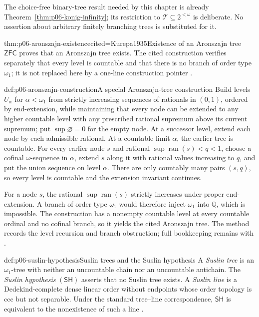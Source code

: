 The choice-free binary-tree result needed by this chapter is already
Theorem~\ref{thm:p06-konig-infinity}; its restriction to
\(\mathcal T\subseteq2^{<\omega}\) is deliberate.  No assertion about arbitrary
finitely branching trees is substituted for it.

\begin{hbtheorem}{thm:p06-aronszajn-existence}{cited=Kurepa1935}{Existence of an Aronszajn tree}
\(\mathsf{ZFC}\) proves that an Aronszajn tree exists.  The cited construction
verifies separately that every level is countable and that there is no branch
of order type \(\omega_1\); it is not replaced here by a one-line construction
pointer \cite{Kurepa1935,Todorcevic1984Trees}.
\end{hbtheorem}

\begin{hbmethod}{def:p06-aronszajn-construction}{A special Aronszajn-tree construction}
Build levels \(U_\alpha\) for \(\alpha<\omega_1\) from strictly increasing
sequences of rationals in \((0,1)\), ordered by end-extension, while
maintaining that every node can be extended to any higher countable level
with any prescribed rational supremum above its current supremum; put
\(\sup\varnothing=0\) for the empty node.  At a
successor level, extend each node by each admissible rational.  At a countable
limit \(\alpha\), the earlier tree is countable.  For every earlier node
\(s\) and rational
\(\sup\operatorname{ran}(s)<q<1\), choose a cofinal
\(\omega\)-sequence in \(\alpha\), extend \(s\) along it with rational values
increasing to \(q\), and put the union sequence on level \(\alpha\).
There are only countably many pairs \((s,q)\), so every level is countable
and the extension invariant continues.

For a node \(s\), the rational \(\sup\operatorname{ran}(s)\) strictly
increases under proper end-extension.  A branch of order type \(\omega_1\)
would therefore inject \(\omega_1\) into \(\mathbb Q\), which is impossible.
The construction has a nonempty countable level at every countable ordinal
and no cofinal branch, so it yields the cited Aronszajn tree.  The method
records the level recursion and branch obstruction; full bookkeeping remains
with \cite{Kurepa1935,Todorcevic1984Trees}.
\end{hbmethod}

\begin{hbdefinition}{def:p06-suslin-hypothesis}{Suslin trees and the Suslin hypothesis}
A \emph{Suslin tree} is an \(\omega_1\)-tree with neither an uncountable
chain nor an uncountable antichain.  The \emph{Suslin hypothesis}
\((\mathsf{SH})\) asserts that no Suslin tree exists.  A \emph{Suslin line}
is a Dedekind-complete dense linear order without endpoints whose order
topology is ccc but not separable.  Under the standard tree--line
correspondence, \(\mathsf{SH}\) is equivalent to the nonexistence of such a
line \cite{Todorcevic1984Trees}.
\end{hbdefinition}

